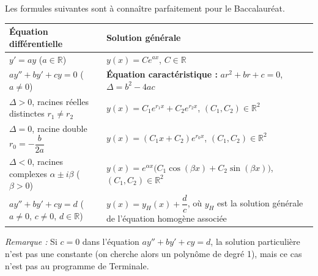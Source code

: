 \documentclass[11pt]{article}
\begin{document}
\begin{propriete}
Les formules suivantes sont à connaître parfaitement pour le Baccalauréat.
\begin{center}
\begin{tabularx}{\linewidth}{|l|X|}
\hline
\rowcolor{popblueL} \textbf{Équation différentielle} & \textbf{Solution générale} \\
\hline
$y' = a y$ \quad ($a \in \mathbb{R}$) & $y(x) = C e^{a x}$, \quad $C \in \mathbb{R}$ \\
\hline
$ay'' + by' + cy = 0$ \quad ($a \neq 0$) & \textbf{Équation caractéristique :} $ar^2 + br + c = 0$, $\Delta = b^2 - 4ac$ \\
\hline
$\Delta > 0$, racines réelles distinctes $r_1 \neq r_2$ & $y(x) = C_1 e^{r_1 x} + C_2 e^{r_2 x}$, \quad $(C_1, C_2) \in \mathbb{R}^2$ \\
\hline
$\Delta = 0$, racine double $r_0 = -\dfrac{b}{2a}$ & $y(x) = (C_1 x + C_2) e^{r_0 x}$, \quad $(C_1, C_2) \in \mathbb{R}^2$ \\
\hline
$\Delta < 0$, racines complexes $\alpha \pm i \beta$ \quad ($\beta > 0$) & $y(x) = e^{\alpha x} \bigl( C_1 \cos(\beta x) + C_2 \sin(\beta x) \bigr)$, \quad $(C_1, C_2) \in \mathbb{R}^2$ \\
\hline
$ay'' + by' + cy = d$ \quad ($a \neq 0$, $c \neq 0$, $d \in \mathbb{R}$) & $y(x) = y_H(x) + \dfrac{d}{c}$, où $y_H$ est la solution générale de l'équation homogène associée \\
\hline
\end{tabularx}
\end{center}
\emph{Remarque :} Si $c = 0$ dans l'équation $ay''+by'+cy=d$, la solution particulière n'est pas une constante (on cherche alors un polynôme de degré 1), mais ce cas n'est pas au programme de Terminale.
\end{propriete}
\end{document}
